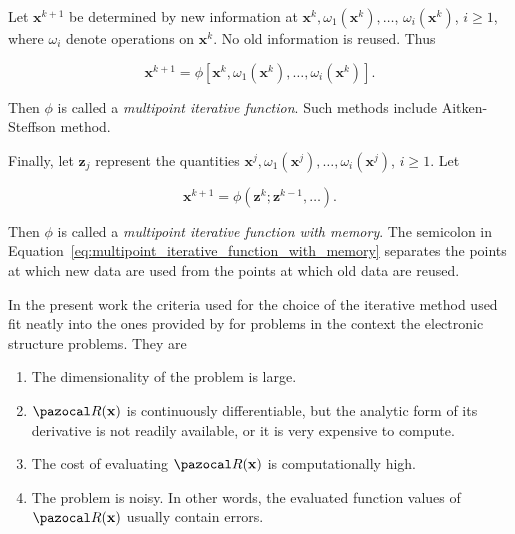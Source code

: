 Let \(\mathbf x^{k+1}\) be determined by new information at \(\mathbf x^{k}, \omega_{1}\left(\mathbf x^{k}\right), \ldots\), \(\omega_{i}\left(\mathbf x^{k}\right)\), \(i \geq 1\), where \(\omega_i\) denote operations on \(\mathbf x^k\).
No old information is reused.
Thus
\begin{highlight}
  \begin{equation}
    \mathbf x^{k+1}=\phi\left[\mathbf x^{k}, \omega_{1}\left(\mathbf x^{k}\right), \ldots, \omega_{i}\left(\mathbf x^{k}\right)\right].
  \end{equation}
\end{highlight}
Then \(\phi\) is called a \textit{multipoint iterative function}.
Such methods include Aitken-Steffson method.

Finally, let \(\mathbf z_{j}\) represent the quantities \(\mathbf x^{j}, \omega_{1}\left(\mathbf x^{j}\right), \ldots, \omega_{i}\left(\mathbf x^{j}\right)\), \(i \geq 1\).
Let
\begin{highlight}
  \begin{equation} \label{eq:multipoint_iterative_function_with_memory}
  \mathbf x^{k+1}=\phi\left(\mathbf z^{k} ; \mathbf z^{k-1}, \dots \right) .
  \end{equation}
\end{highlight}
Then \(\phi\) is called a \textit{multipoint iterative function with memory}.
The semicolon in Equation~\eqref{eq:multipoint_iterative_function_with_memory} separates the points at which new data are used from the points at which old data are reused.

In the present work the criteria used for the choice of the iterative method used fit neatly into the ones provided by \cite{fang_two_2009} for problems in the context the electronic structure problems.
They are
\begin{enumerate}
  \item The dimensionality of the problem is large.
  \item \(\pazocal R(\mathbf x)\) is continuously differentiable, but the analytic form of its derivative is not readily available, or it is very expensive to compute.
  \item The cost of evaluating \(\pazocal R(\mathbf x)\) is computationally high.
  \item The problem is noisy. In other words, the evaluated function values of \(\pazocal R(\mathbf x)\) usually contain errors.
\end{enumerate}

